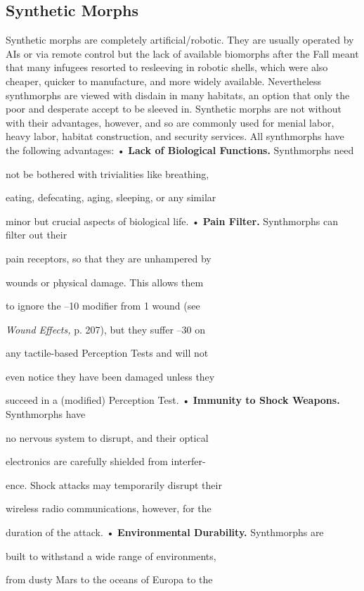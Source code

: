 \subsection{Synthetic Morphs}

Synthetic morphs are completely artificial/robotic. 
They are usually operated by AIs or via remote control
but the lack of available biomorphs after the
Fall meant that many infugees resorted to resleeving 
in robotic shells, which were also cheaper, quicker to 
manufacture, and more widely available. Nevertheless
synthmorphs are viewed with disdain in many
habitats, an option that only the poor and desperate 
accept to be sleeved in. Synthetic morphs are not 
without with their advantages, however, and so are 
commonly used for menial labor, heavy labor, habitat 
construction, and security services.
All synthmorphs have the following advantages:
•  \textbf{Lack of Biological Functions.} Synthmorphs need 

not be bothered with trivialities like breathing, 

eating, defecating, aging, sleeping, or any similar 

minor but crucial aspects of biological life.
•  \textbf{Pain Filter.} Synthmorphs can filter out their 

pain receptors, so that they are unhampered by 

wounds or physical damage. This allows them 

to ignore the –10 modifier from 1 wound (see 

\textit{Wound Effects,} p. 207), but they suffer –30 on 

any tactile-based Perception Tests and will not 

even notice they have been damaged unless they 

succeed in a (modified) Perception Test.
•  \textbf{Immunity to Shock Weapons.} Synthmorphs have 

no nervous system to disrupt, and their optical 

electronics are carefully shielded from interfer-

ence. Shock attacks may temporarily disrupt their 

wireless radio communications, however, for the 

duration of the attack.
•  \textbf{Environmental Durability.} Synthmorphs are 

built to withstand a wide range of environments, 

from dusty Mars to the oceans of Europa to the 

